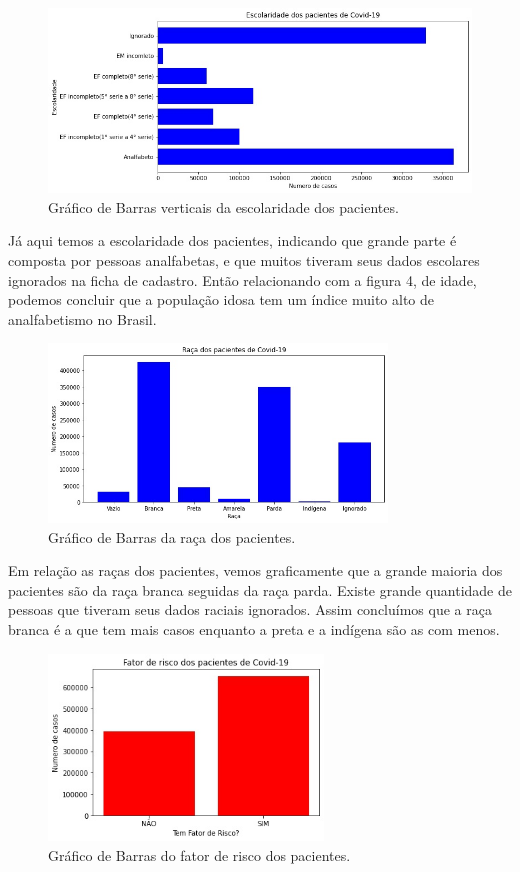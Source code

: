 \documentclass[tcc1]{uftex}
\begin{document}
\begin{itemize}
    \begin{figure}[h]
    \centering
    \includegraphics[width=12cm]{Escolaridade.jpg} %
    \caption{Gráfico de Barras verticais da escolaridade dos pacientes.}
    \end{figure}
    
    Já aqui temos a escolaridade dos pacientes, indicando que grande parte é composta por pessoas analfabetas, e que muitos tiveram seus dados escolares ignorados na ficha de cadastro. Então relacionando com a figura 4, de idade, podemos concluir que a população idosa tem um índice muito alto de analfabetismo no Brasil.

    \begin{figure}[h]
    \centering
    \includegraphics[width=9cm]{Raca.jpg} %
    \caption{Gráfico de Barras da raça dos pacientes.}
    \end{figure}
   
   Em relação as raças dos pacientes, vemos graficamente que a grande maioria dos pacientes são da raça branca seguidas da raça parda. Existe grande quantidade de pessoas que tiveram seus dados raciais ignorados. Assim concluímos que a raça branca é a que tem mais casos enquanto a preta e a indígena são as com menos.
   
   \begin{figure}[h]
    \centering
    \includegraphics[width=7.3cm]{FatorRisco.jpg} %
    \caption{Gráfico de Barras do fator de risco dos pacientes.}
    \end{figure}
    

\end{itemize}
\end{document}
